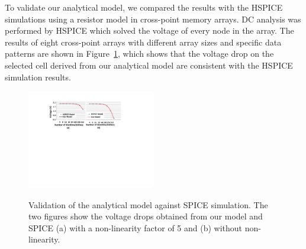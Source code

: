 To validate our analytical model, we compared the results with the HSPICE
simulations using a resistor model in cross-point memory arrays. DC
analysis was performed by HSPICE which solved the voltage of every node in
the array. The results of eight cross-point arrays with different array
sizes and specific data patterns are shown in Figure~\ref{fig:validation},
which shows that the voltage drop on the selected cell derived from our analytical
model are consistent with the HSPICE simulation results.
\begin{figure}%
\centering\label{fig:SPICE}
  \includegraphics[width=0.5\textwidth]{./figures/SPICE.pdf}\\
  \caption{Validation of the analytical model against SPICE simulation. The two figures show the voltage drops obtained from our model and SPICE (a) with a non-linearity factor of 5 and (b) without non-linearity.}\label{fig:validation}
    \vspace{-10pt}
\end{figure}
%
